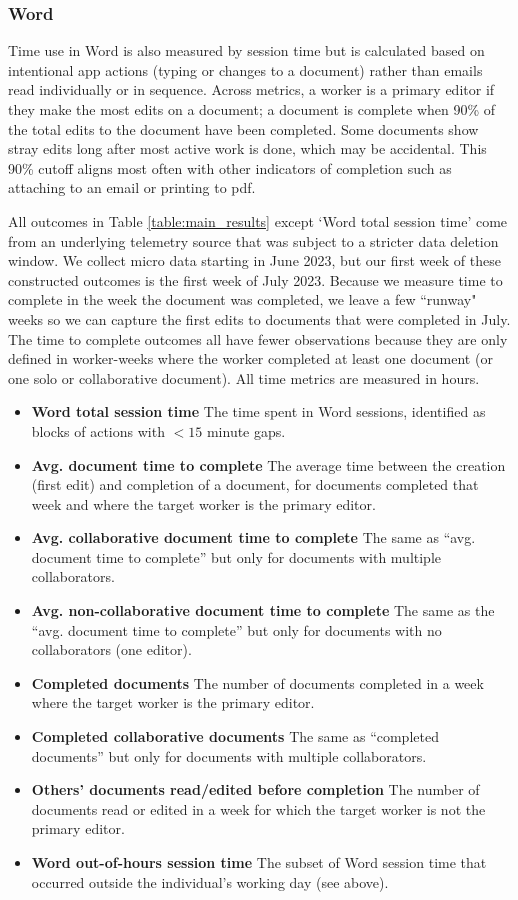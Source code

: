 \documentclass{article}
\newcommand{\bitem}[1]{\item \textbf{#1}}
\begin{document}
\subsubsection{Word} 
    Time use in Word is also measured by session time but is calculated based on intentional app actions (typing or changes to a document) rather than emails read individually or in sequence.  Across metrics, a worker is a primary editor if they make the most edits on a document; a document is complete when 90\% of the total edits to the document have been completed. Some documents show stray edits long after most active work is done, which may be accidental. This 90\% cutoff aligns most often with other indicators of completion such as attaching to an email or printing to pdf. 

    All outcomes in Table \ref{table:main_results} except `Word total session time' come from an underlying telemetry source that was subject to a stricter data deletion window. We collect micro data starting in June 2023, but our first week of these constructed outcomes is the first week of July 2023. Because we measure time to complete in the week the document was completed, we leave a few ``runway" weeks so we can capture the first edits to documents that were completed in July. The time to complete outcomes all have fewer observations because they are only defined in worker-weeks where the worker completed at least one document (or one solo or collaborative document). All time metrics are measured in hours.
   \begin{itemize}[noitemsep]
     \bitem{Word total session time} The time spent in Word sessions, identified as blocks of actions with $<15$ minute gaps.
     \bitem{Avg. document time to complete} The average time between the creation (first edit) and completion of a document, for documents completed that week and where the target worker is the primary editor. 
     \bitem{Avg. collaborative document time to complete} The same as ``avg. document time to complete'' but only for documents with multiple collaborators.
     \bitem{Avg. non-collaborative document time to complete} The same as the ``avg. document time to complete'' but only for documents with no collaborators (one editor).
     \bitem{Completed documents} The number of documents completed in a week where the target worker is the primary editor.
     \bitem{Completed collaborative documents} The same as ``completed documents'' but only for documents with multiple collaborators.
     \bitem{Others' documents read/edited before completion} The number of documents read or edited in a week for which the target worker is not the primary editor.
     \bitem{Word out-of-hours session time} The subset of Word session time that occurred outside the individual's working day (see above).
 \end{itemize} 
\end{document}
